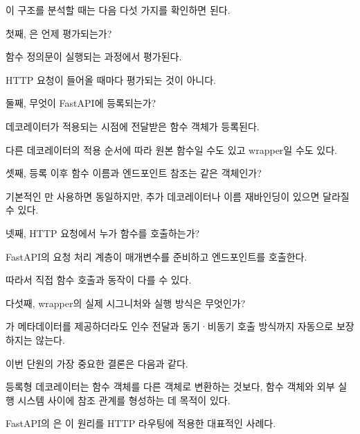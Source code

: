 이 구조를 분석할 때는 다음 다섯 가지를 확인하면 된다.

\begin{dhknote}
\begin{dhksmry}[centered]
첫째, 은 언제 평가되는가? 
\end{dhksmry}
\end{dhknote}

함수 정의문이 실행되는 과정에서 평가된다. 

HTTP 요청이 들어올 때마다 평가되는 것이 아니다.

\begin{dhknote}
\begin{dhksmry}[centered]
둘째, 무엇이 FastAPI에 등록되는가?
\end{dhksmry}
\end{dhknote}
데코레이터가 적용되는 시점에 전달받은 함수 객체가 등록된다. 

다른 데코레이터의 적용 순서에 따라 원본 함수일 수도 있고 wrapper일 수도 있다.

\begin{dhknote}
\begin{dhksmry}[centered]
셋째, 등록 이후 함수 이름과 엔드포인트 참조는 같은 객체인가?
\end{dhksmry}
\end{dhknote}

기본적인 만 사용하면 동일하지만, 추가 데코레이터나 이름 재바인딩이 있으면 달라질 수 있다.

\begin{dhknote}
\begin{dhksmry}[centered]
넷째, HTTP 요청에서 누가 함수를 호출하는가? 
\end{dhksmry}
\end{dhknote}
FastAPI의 요청 처리 계층이 매개변수를 준비하고 엔드포인트를 호출한다. 

따라서 직접 함수 호출과 동작이 다를 수 있다.

\begin{dhknote}
\begin{dhksmry}[centered]
다섯째, wrapper의 실제 시그니처와 실행 방식은 무엇인가?
\end{dhksmry}
\end{dhknote}

가 메타데이터를 제공하더라도 인수 전달과 동기·비동기 호출 방식까지 자동으로 보장하지는 않는다.

이번 단원의 가장 중요한 결론은 다음과 같다.

등록형 데코레이터는 함수 객체를 다른 객체로 변환하는 것보다, 함수 객체와 외부 실행 시스템 사이에 참조 관계를 형성하는 데 목적이 있다.

FastAPI의 은 이 원리를 HTTP 라우팅에 적용한 대표적인 사례다.